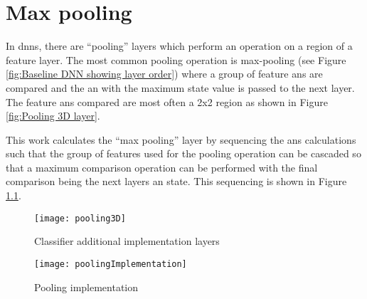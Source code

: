

\chapter{Max pooling}
\label{sec:Appendix-B}
\label{sec:Max pooling}

In \acp{dnn}, there are ``pooling'' layers which perform an operation on a region of a feature layer. 
The most common pooling operation is max-pooling (see Figure \ref{fig:Baseline DNN showing layer order}) where a group of feature \acp{an} are compared and the \ac{an} with the maximum state value is passed to the next layer.
The feature \acp{an} compared are most often a 2x2 region as shown in Figure \ref{fig:Pooling 3D layer}.

This work calculates the ``max pooling'' layer by sequencing the \acp{an} calculations such that the group of features used for the pooling operation can be cascaded so that a maximum comparison operation can be performed with the final comparison being the next layers \ac{an} state.
This sequencing is shown in Figure \ref{fig:Pooling implementation}.

\begin{figure}[h]
  \centering
  \captionsetup{justification=centering}
  \captionsetup{width=0.9\textwidth}
  \begin{minipage}{1\textwidth}
    \centering
    \centerline{
    \mbox{\texttt{[image: pooling3D]}}
    }
    \caption{Classifier additional implementation layers}
    \label{fig:Pooling 3D layer}
  \end{minipage}

  \bigskip
  \vspace{0.5cm}
  \begin{minipage}{1\textwidth}
    \centering
    \centerline{
    \mbox{\texttt{[image: poolingImplementation]}}
    }
    \caption{Pooling implementation}
    \label{fig:Pooling implementation}
  \end{minipage}
\end{figure}


